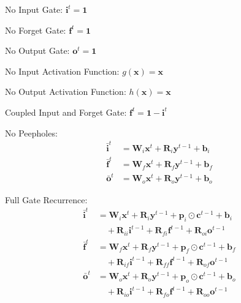 \begin{description}[align=right, labelwidth=1.5cm]
    \item [NIG:] No Input Gate: \( \mathbf{i}^t = \mathbf{1}\)
    \item [NFG:] No Forget Gate: \( \mathbf{f}^t = \mathbf{1}\)
    \item [NOG:] No Output Gate: \( \mathbf{o}^t = \mathbf{1}\)
    \item [NIAF:] No Input Activation Function: \(g(\mathbf{x}) = \mathbf{x}\)
    \item [NOAF:] No Output Activation Function: \(h(\mathbf{x}) = \mathbf{x}\)
    \item [CIFG:] Coupled Input and Forget Gate: 
        \( \mathbf{f}^t = \mathbf{1} - \mathbf{i}^t\)

    \item [NP:] No Peepholes:
\begin{align*}
        \bar{\mathbf{i}}^{t} &=\mathbf{W}_{i}\mathbf{x}^{t}+\mathbf{R}_{i}\mathbf{y}^{t-1} + \mathbf{b}_i \\
        \bar{\mathbf{f}}^{t} &=\mathbf{W}_{f}\mathbf{x}^{t}+\mathbf{R}_{f}\mathbf{y}^{t-1} + \mathbf{b}_f \\
        \bar{\mathbf{o}}^{t} &=\mathbf{W}_{o}\mathbf{x}^{t}+\mathbf{R}_{o}\mathbf{y}^{t-1} + \mathbf{b}_o
\end{align*}

    \item [FGR:] Full Gate Recurrence:
\begin{align*}
        \bar{\mathbf{i}}^{t} &=\mathbf{W}_{i}\mathbf{x}^{t}+\mathbf{R}_{i}\mathbf{y}^{t-1}+\mathbf{p}_{i}\odot\mathbf{c}^{t-1} + \mathbf{b}_i\\
         &\quad+ \mathbf{R}_{ii}\mathbf{i}^{t-1}+\mathbf{R}_{fi}\mathbf{f}^{t-1}+\mathbf{R}_{oi}\mathbf{o}^{t-1} \\

        \bar{\mathbf{f}}^{t} &=\mathbf{W}_{f}\mathbf{x}^{t}+\mathbf{R}_{f}\mathbf{y}^{t-1}+\mathbf{p}_{f}\odot\mathbf{c}^{t-1} + \mathbf{b}_f \\
         &\quad+ \mathbf{R}_{if}\mathbf{i}^{t-1}+\mathbf{R}_{ff}\mathbf{f}^{t-1}+\mathbf{R}_{of}\mathbf{o}^{t-1} \\

        \bar{\mathbf{o}}^{t} &=\mathbf{W}_{o}\mathbf{x}^{t}+\mathbf{R}_{o}\mathbf{y}^{t-1}+\mathbf{p}_{o}\odot\mathbf{c}^{t-1}  + \mathbf{b}_o \\
        &\quad+ \mathbf{R}_{io}\mathbf{i}^{t-1}+\mathbf{R}_{fo}\mathbf{f}^{t-1}+\mathbf{R}_{oo}\mathbf{o}^{t-1}
\end{align*}
\end{description}

